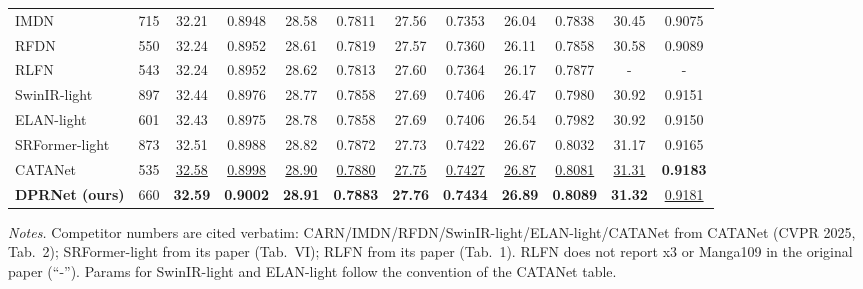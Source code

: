 \begin{table}[t]
\begin{tabular*}{\textwidth}{@{\extracolsep{\fill}}lccccccccccc}
IMDN            & 715  & 32.21 & 0.8948 & 28.58 & 0.7811 & 27.56 & 0.7353 & 26.04 & 0.7838 & 30.45 & 0.9075 \\
RFDN            & 550  & 32.24 & 0.8952 & 28.61 & 0.7819 & 27.57 & 0.7360 & 26.11 & 0.7858 & 30.58 & 0.9089 \\
RLFN            & 543  & 32.24 & 0.8952 & 28.62 & 0.7813 & 27.60 & 0.7364 & 26.17 & 0.7877 & -     & -      \\
SwinIR-light    & 897  & 32.44 & 0.8976 & 28.77 & 0.7858 & 27.69 & 0.7406 & 26.47 & 0.7980 & 30.92 & 0.9151 \\
ELAN-light      & 601  & 32.43 & 0.8975 & 28.78 & 0.7858 & 27.69 & 0.7406 & 26.54 & 0.7982 & 30.92 & 0.9150 \\
SRFormer-light  & 873  & 32.51 & 0.8988 & 28.82 & 0.7872 & 27.73 & 0.7422 & 26.67 & 0.8032 & 31.17 & 0.9165 \\
CATANet         & 535  & \underline{32.58} & \underline{0.8998} & \underline{28.90} & \underline{0.7880} & \underline{27.75} & \underline{0.7427} & \underline{26.87} & \underline{0.8081} & \underline{31.31} & \textbf{0.9183} \\
\textbf{DPRNet (ours)} & 660 & \textbf{32.59} & \textbf{0.9002} & \textbf{28.91} & \textbf{0.7883} & \textbf{27.76} & \textbf{0.7434} & \textbf{26.89} & \textbf{0.8089} & \textbf{31.32} & \underline{0.9181} \\
\bottomrule
\end{tabular*}
\endgroup

\vspace{2pt}
{\footnotesize
\textit{Notes.} Competitor numbers are cited verbatim: CARN/IMDN/RFDN/SwinIR-light/ELAN-light/CATANet from CATANet
(CVPR 2025, Tab.~2); SRFormer-light from its paper (Tab.~VI); RLFN from its paper (Tab.~1).
RLFN does not report x3 or Manga109 in the original paper (``-''). Params for SwinIR-light and
ELAN-light follow the convention of the CATANet table.}
\end{table}
